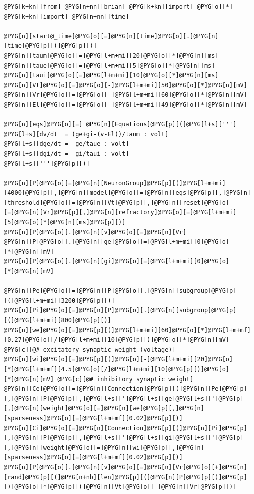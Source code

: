 \documentclass[letterpaper,10pt,english]{manual}
\begin{document}
\begin{Verbatim}[commandchars=@\[\]]
@PYG[k+kn][from] @PYG[n+nn][brian] @PYG[k+kn][import] @PYG[o][*]
@PYG[k+kn][import] @PYG[n+nn][time]

@PYG[n][start@_time]@PYG[o][=]@PYG[n][time]@PYG[o][.]@PYG[n][time]@PYG[p][(]@PYG[p][)]
@PYG[n][taum]@PYG[o][=]@PYG[l+m+mi][20]@PYG[o][*]@PYG[n][ms]
@PYG[n][taue]@PYG[o][=]@PYG[l+m+mi][5]@PYG[o][*]@PYG[n][ms]
@PYG[n][taui]@PYG[o][=]@PYG[l+m+mi][10]@PYG[o][*]@PYG[n][ms]
@PYG[n][Vt]@PYG[o][=]@PYG[o][-]@PYG[l+m+mi][50]@PYG[o][*]@PYG[n][mV]
@PYG[n][Vr]@PYG[o][=]@PYG[o][-]@PYG[l+m+mi][60]@PYG[o][*]@PYG[n][mV]
@PYG[n][El]@PYG[o][=]@PYG[o][-]@PYG[l+m+mi][49]@PYG[o][*]@PYG[n][mV]

@PYG[n][eqs]@PYG[o][=] @PYG[n][Equations]@PYG[p][(]@PYG[l+s][''']
@PYG[l+s][dv/dt  = (ge+gi-(v-El))/taum : volt]
@PYG[l+s][dge/dt = -ge/taue : volt]
@PYG[l+s][dgi/dt = -gi/taui : volt]
@PYG[l+s][''']@PYG[p][)]

@PYG[n][P]@PYG[o][=]@PYG[n][NeuronGroup]@PYG[p][(]@PYG[l+m+mi][4000]@PYG[p][,]@PYG[n][model]@PYG[o][=]@PYG[n][eqs]@PYG[p][,]@PYG[n][threshold]@PYG[o][=]@PYG[n][Vt]@PYG[p][,]@PYG[n][reset]@PYG[o][=]@PYG[n][Vr]@PYG[p][,]@PYG[n][refractory]@PYG[o][=]@PYG[l+m+mi][5]@PYG[o][*]@PYG[n][ms]@PYG[p][)]
@PYG[n][P]@PYG[o][.]@PYG[n][v]@PYG[o][=]@PYG[n][Vr]
@PYG[n][P]@PYG[o][.]@PYG[n][ge]@PYG[o][=]@PYG[l+m+mi][0]@PYG[o][*]@PYG[n][mV]
@PYG[n][P]@PYG[o][.]@PYG[n][gi]@PYG[o][=]@PYG[l+m+mi][0]@PYG[o][*]@PYG[n][mV]

@PYG[n][Pe]@PYG[o][=]@PYG[n][P]@PYG[o][.]@PYG[n][subgroup]@PYG[p][(]@PYG[l+m+mi][3200]@PYG[p][)]
@PYG[n][Pi]@PYG[o][=]@PYG[n][P]@PYG[o][.]@PYG[n][subgroup]@PYG[p][(]@PYG[l+m+mi][800]@PYG[p][)]
@PYG[n][we]@PYG[o][=]@PYG[p][(]@PYG[l+m+mi][60]@PYG[o][*]@PYG[l+m+mf][0.27]@PYG[o][/]@PYG[l+m+mi][10]@PYG[p][)]@PYG[o][*]@PYG[n][mV] @PYG[c][@# excitatory synaptic weight (voltage)]
@PYG[n][wi]@PYG[o][=]@PYG[p][(]@PYG[o][-]@PYG[l+m+mi][20]@PYG[o][*]@PYG[l+m+mf][4.5]@PYG[o][/]@PYG[l+m+mi][10]@PYG[p][)]@PYG[o][*]@PYG[n][mV] @PYG[c][@# inhibitory synaptic weight]
@PYG[n][Ce]@PYG[o][=]@PYG[n][Connection]@PYG[p][(]@PYG[n][Pe]@PYG[p][,]@PYG[n][P]@PYG[p][,]@PYG[l+s][']@PYG[l+s][ge]@PYG[l+s][']@PYG[p][,]@PYG[n][weight]@PYG[o][=]@PYG[n][we]@PYG[p][,]@PYG[n][sparseness]@PYG[o][=]@PYG[l+m+mf][0.02]@PYG[p][)]
@PYG[n][Ci]@PYG[o][=]@PYG[n][Connection]@PYG[p][(]@PYG[n][Pi]@PYG[p][,]@PYG[n][P]@PYG[p][,]@PYG[l+s][']@PYG[l+s][gi]@PYG[l+s][']@PYG[p][,]@PYG[n][weight]@PYG[o][=]@PYG[n][wi]@PYG[p][,]@PYG[n][sparseness]@PYG[o][=]@PYG[l+m+mf][0.02]@PYG[p][)]
@PYG[n][P]@PYG[o][.]@PYG[n][v]@PYG[o][=]@PYG[n][Vr]@PYG[o][+]@PYG[n][rand]@PYG[p][(]@PYG[n+nb][len]@PYG[p][(]@PYG[n][P]@PYG[p][)]@PYG[p][)]@PYG[o][*]@PYG[p][(]@PYG[n][Vt]@PYG[o][-]@PYG[n][Vr]@PYG[p][)]


\end{Verbatim}
\end{document}
